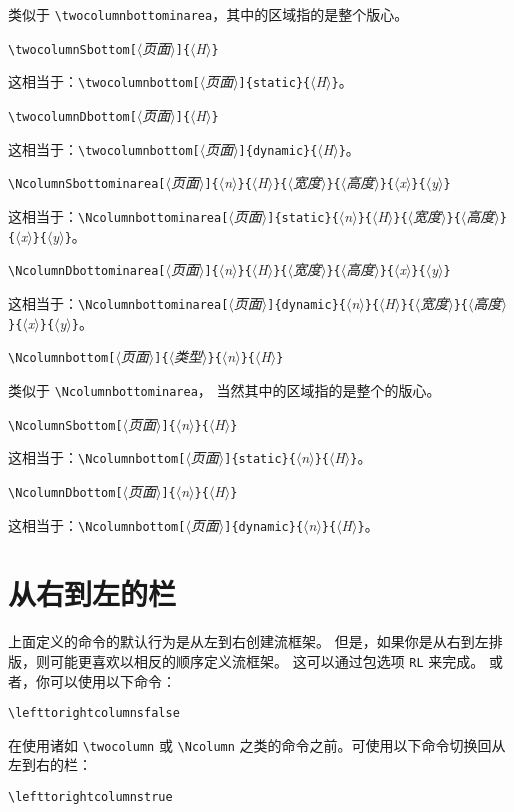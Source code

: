 \documentclass[a4paper]{book}%
\newcommand{\meta}[1]{\textnormal{\ensuremath{\langle}\makebox[0pt][l]{}\emph{#1}\makebox[0pt][l]{}\ensuremath{\rangle}}}
\newcommand{\cmd}[1]{\texttt{#1}}
\begin{document}
类似于 \verb|\twocolumnbottominarea|，其中的区域指的是整个版心。
\begin{mdframed}
    \verb|\twocolumnSbottom[|\meta{页面}\verb|]{|\meta{H}\verb|}|
\end{mdframed}
这相当于：\verb|\twocolumnbottom[|\meta{页面}\verb|]{static}{|\meta{H}\verb|}|。
\begin{mdframed}
    \verb|\twocolumnDbottom[|\meta{页面}\verb|]{|\meta{H}\verb|}|
\end{mdframed}
这相当于：\verb|\twocolumnbottom[|\meta{页面}\verb|]{dynamic}{|\meta{H}\verb|}|。
\begin{mdframed}
    \verb|\NcolumnSbottominarea[|\meta{页面}\verb|]{|\meta{n}\verb|}{|\meta{H}\verb|}{|\meta{宽度}\verb|}{|\meta{高度}\verb|}{|\meta{x}\verb|}{|\meta{y}\verb|}|
\end{mdframed}
这相当于：\verb|\Ncolumnbottominarea[|\meta{页面}\verb|]{static}{|\meta{n}\verb|}{|\meta{H}\verb|}{|\meta{宽度}\verb|}{|\meta{高度}\verb|}{|\meta{x}\verb|}{|\meta{y}\verb|}|。
\begin{mdframed}
    \verb|\NcolumnDbottominarea[|\meta{页面}\verb|]{|\meta{n}\verb|}{|\meta{H}\verb|}{|\meta{宽度}\verb|}{|\meta{高度}\verb|}{|\meta{x}\verb|}{|\meta{y}\verb|}|
\end{mdframed}
这相当于：\verb|\Ncolumnbottominarea[|\meta{页面}\verb|]{dynamic}{|\meta{n}\verb|}{|\meta{H}\verb|}{|\meta{宽度}\verb|}{|\meta{高度}\verb|}{|\meta{x}\verb|}{|\meta{y}\verb|}|。
\begin{mdframed}
    \verb|\Ncolumnbottom[|\meta{页面}\verb|]{|\meta{类型}\verb|}{|\meta{n}\verb|}{|\meta{H}\verb|}|
\end{mdframed}
类似于 \verb|\Ncolumnbottominarea|， 当然其中的区域指的是整个的版心。
\begin{mdframed}
    \verb|\NcolumnSbottom[|\meta{页面}\verb|]{|\meta{n}\verb|}{|\meta{H}\verb|}|
\end{mdframed}
这相当于：\verb|\Ncolumnbottom[|\meta{页面}\verb|]{static}{|\meta{n}\verb|}{|\meta{H}\verb|}|。
\begin{mdframed}
    \verb|\NcolumnDbottom[|\meta{页面}\verb|]{|\meta{n}\verb|}{|\meta{H}\verb|}|
\end{mdframed}
这相当于：\verb|\Ncolumnbottom[|\meta{页面}\verb|]{dynamic}{|\meta{n}\verb|}{|\meta{H}\verb|}|。
\section{从右到左的栏}%
上面定义的命令的默认行为是从左到右创建流框架。 但是，如果你是从右到左排版，则可能更喜欢以相反的顺序定义流框架。 这可以通过包选项 \cmd{RL} 来完成。 或者，你可以使用以下命令：
\begin{mdframed}
    \verb|\lefttorightcolumnsfalse|
\end{mdframed}
在使用诸如 \verb|\twocolumn| 或 \verb|\Ncolumn| 之类的命令之前。可使用以下命令切换回从左到右的栏：
\begin{mdframed}
    \verb|\lefttorightcolumnstrue|
\end{mdframed}
\end{document}
